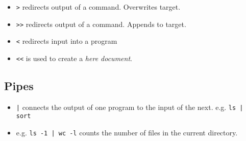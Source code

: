 \begin{itemize}
\item \texttt{\textgreater} redirects output of a command. Overwrites
  target.
\item \texttt{\textgreater\textgreater} redirects output of a
  command. Appends to target.
\item \texttt{\textless} redirects input into a program
\item \texttt{\textless\textless} is used to create a \emph{here document}.
\end{itemize}
\subsection{Pipes}
\begin{itemize}
\item \texttt{|} connects the output of one program to the input of
  the next. e.g. \texttt{ls | sort}
\item e.g. \texttt{ls -1 | wc -l} counts the number of files in the
  current directory.
\end{itemize}
